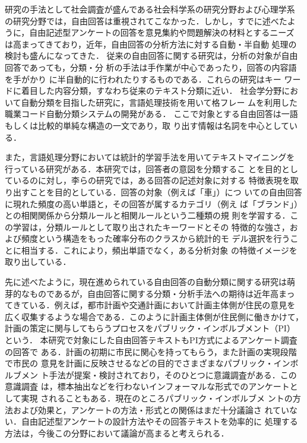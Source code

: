 研究の手法として社会調査が盛んである社会科学系の研究分野および心理学系
の研究分野では，自由回答は重視されてこなかった．しかし，すでに述べたよ
うに，自由記述型アンケートの回答を意見集約や問題解決の材料とするニーズ
は高まってきており，近年，自由回答の分析方法に対する自動・半自動
処理の検討も盛んになってきた\cite{oosumi:97,hitachi:00,takahashi:00}．
従来の自由回答に関する研究は，分析の対象が自由回答であっても，分類・分
析の手法は手作業が中心であったり\cite{suga:97}，回答の内容語を手がかり
に半自動的に行われたりするものである\cite{oosumi:97}．これらの研究はキー
ワードに着目した内容分類，すなわち従来のテキスト分類に近い．
社会学分野において自動分類を目指した研究に，言語処理技術を用いて格フレー
ムを利用した職業コード自動分類システムの開発がある\cite{takahashi:00}．
ここで対象とする自由回答は一語もしくは比較的単純な構造の一文であり，取
り出す情報は名詞を中心としている．

また，言語処理分野においては統計的学習手法を用いてテキストマイニングを
行っている研究がある\cite{li:01}．本研究では，回答者の意図を分類するこ
とを目的としているのに対し，李らの研究では，ある回答の記述対象に対する
特徴表現を取り出すことを目的としている．回答の対象（例えば「車」）につ
いての自由回答に現れた頻度の高い単語と，その回答が属するカテゴリ（例え
ば「ブランド」）との相関関係から分類ルールと相関ルールという二種類の規
則を学習する．この学習は，分類ルールとして取り出されたキーワードとその
特徴的な強さ，および頻度という構造をもった確率分布のクラスから統計的モ
デル選択を行うことに相当する．これにより，頻出単語でなく，ある分析対象
の特徴イメージを取り出している．

先に述べたように，現在進められている自由回答の自動分類に関する研究は萌
芽的なものであるが，自由回答に関する分類・分析手法への期待は近年高まっ
てきている．例えば，都市計画や交通計画において計画主体側が住民の意見を
広く収集するような場合である．このように計画主体側が住民側に働きかけて，
計画の策定に関与してもらうプロセスをパブリック・インボルブメント（PI）
という．
本研究で対象にした自由回答テキストもPI方式によるアンケート調査の回答で
ある．計画の初期に市民に関心を持ってもらう，また計画の実現段階で市民の
意見を計画に反映させるなどの目的でさまざまなパブリック・インボルブメン
ト手法が提案・検討されており，そのひとつに意識調査がある．この意識調査
は，標本抽出などを行わないインフォーマルな形式でのアンケートとして実現
されることもある\cite{saishu:98}．現在のところパブリック・インボルブメ
ントの方法および効果と，アンケートの方法・形式との関係はまだ十分議論さ
れていない．自由記述型アンケートの設計方法やその回答テキストを効率的に
処理する方法は，今後この分野において議論が高まると考えられる．

